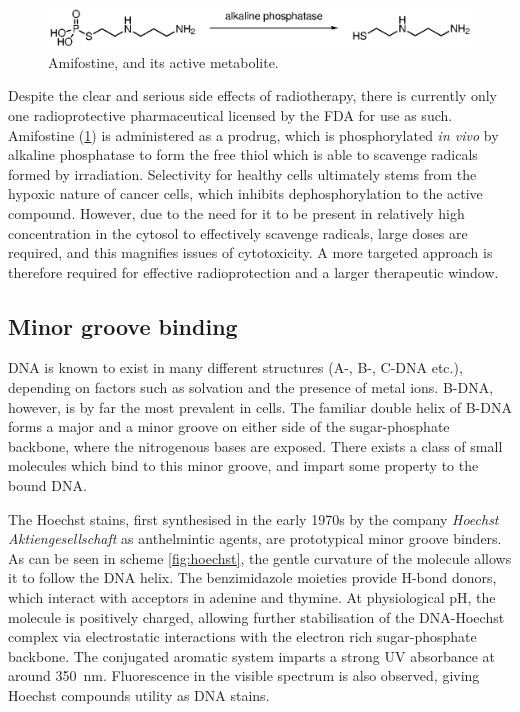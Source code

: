 \begin{refsection}
\begin{figure}
\centering
\includegraphics[scale=0.74]{Figures/amifostine.eps}
\caption{Amifostine, and its active metabolite.}\label{fig:amifostine}
\end{figure}

Despite the clear and serious side effects of radiotherapy, there is currently only one radioprotective pharmaceutical licensed by the FDA for use as such.
Amifostine (\cref{fig:amifostine}) is administered as a prodrug, which is phosphorylated \emph{in vivo} by alkaline phosphatase to form the free thiol which is able to scavenge radicals formed by irradiation.
Selectivity for healthy cells ultimately stems from the hypoxic nature of cancer cells, which inhibits dephosphorylation to the active compound\autocite{Kouvaris2007}.
However, due to the need for it to be present in relatively high concentration in the cytosol to effectively scavenge radicals, large doses are required, and this magnifies issues of cytotoxicity.
A more targeted approach is therefore required for effective radioprotection and a larger therapeutic window.

\subsection{Minor groove binding}
DNA is known to exist in many different structures (A-, B-, C-DNA etc.), depending on factors such as solvation and the presence of metal ions.
B-DNA, however, is by far the most prevalent in cells\autocite{Miyahara2012}.
The familiar double helix of B-DNA forms a major and a minor groove on either side of the sugar-phosphate backbone, where the nitrogenous bases are exposed.
There exists a class of small molecules which bind to this minor groove, and impart some property to the bound DNA.\@

The Hoechst stains, first synthesised in the early 1970s by the company \emph{Hoechst Aktiengesellschaft} as anthelmintic agents, are prototypical minor groove binders.
As can be seen in scheme \cref{fig:hoechst}, the gentle curvature of the molecule allows it to follow the DNA helix.
The benzimidazole moieties provide H-bond donors, which interact with acceptors in adenine and thymine.
At physiological pH, the molecule is positively charged, allowing further stabilisation of the DNA-Hoechst complex via electrostatic interactions with the electron rich sugar-phosphate backbone\autocite{Teng1988}.
The conjugated aromatic system imparts a strong UV absorbance at around \SI{350}{\nm}. Fluorescence in the visible spectrum is also observed, giving Hoechst compounds utility as DNA stains.


\end{refsection}

